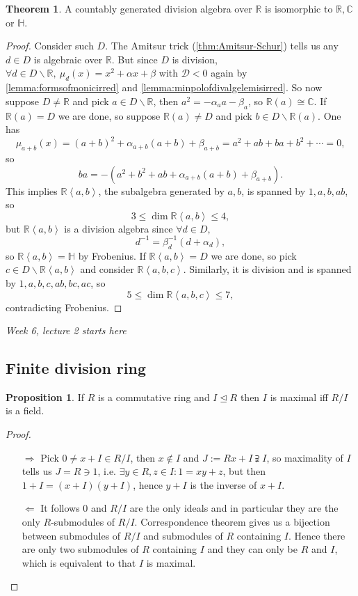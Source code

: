 \documentclass[a4paper]{article}
\newcommand{\la}{\left\langle}
\newcommand{\ra}{\right\rangle}
\newcommand{\R}{\mathbb{R}}
\newcommand{\C}{\mathbb{C}}
\newcommand{\Hq}{\mathbb{H}}
\theoremstyle{definition}
\newtheorem{prop}[defn]{Proposition}
\newtheorem{thm}[defn]{Theorem}
\begin{document}
\begin{thm}
\label{thm:countableFrobenius}
A countably generated division algebra over $\R$ is isomorphic to $\R,\C$ or $\Hq$.
\end{thm}
\begin{proof}
Consider such $D$. The Amitsur trick (\ref{thm:Amitsur-Schur}) tells us any $d\in D$ is algebraic over $\R$. But since $D$ is division, $\forall d\in D\backslash\R,\ \mu_d(x)=x^2+\alpha x+\beta$ with $\mathcal D<0$ again by \ref{lemma:formsofmonicirred} and \ref{lemma:minpolofdivalgelemisirred}. So now suppose $D\neq\R$ and pick $a\in D\backslash\R$, then $a^2=-\alpha_a a-\beta_a$, so $\R(a)\cong\C$. If $\R(a)=D$ we are done, so suppose $\R(a)\neq D$ and pick $b\in D\backslash \R(a)$. One has
\[
\mu_{a+b}(x)=(a+b)^2+\alpha_{a+b}(a+b)+\beta_{a+b}=a^2+ab+ba+b^2+\cdots=0,
\]
so
\[
ba=-\left(a^2+b^2+ab+\alpha_{a+b}(a+b)+\beta_{a+b}\right).
\]
This implies $\R\la a,b\ra$, the subalgebra generated by $a,b$, is spanned by $1,a,b,ab$, so
\[
3\leq\dim\R\la a,b\ra\leq 4,
\]
but $\R\la a,b\ra$ is a division algebra since $\forall d\in D,$
\[
d^{-1}=\beta_d^{-1}(d+\alpha_d),
\]
so $\R\la a,b\ra=\Hq$ by Frobenius. If $\R\la a,b\ra =D$ we are done, so pick $c\in D\backslash \R\la a,b\ra$ and consider $\R\la a,b,c\ra$. Similarly, it is division and is spanned by $1,a,b,c,ab,bc,ac$, so
\[
5\leq \dim \R\la a,b,c\ra \leq 7,
\]
contradicting Frobenius.
\end{proof}

\begin{flushright}
\textit{Week 6, lecture 2 starts here}
\end{flushright}

\subsection{Finite division ring}
\begin{prop}
\label{prop:ImaxiffRqIfield}
If $R$ is a commutative ring and $I\unlhd R$ then $I$ is maximal iff $R/I$ is a field.
\end{prop}
\begin{proof}
\begin{itemize}
\item[$\Rightarrow$] Pick $0\neq x+I\in R/I$, then $x\notin I$ and $J:=Rx+I\supsetneqq I$, so maximality of $I$ tells us $J=R\ni 1$, i.e. $\exists y\in R,z\in I:1=xy+z$, but then $1+I=(x+I)(y+I)$, hence $y+I$ is the inverse of $x+I$.
\item[$\Leftarrow$] It follows $0$ and $R/I$ are the only ideals and in particular they are the only $R$-submodules of $R/I$. Correspondence theorem gives us a bijection between submodules of $R/I$ and submodules of $R$ containing $I$. Hence there are only two submodules of $R$ containing $I$ and they can only be $R$ and $I$, which is equivalent to that $I$ is maximal.
\end{itemize}
\end{proof}
\end{document}
